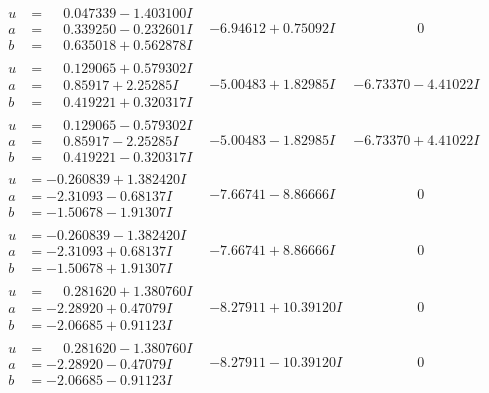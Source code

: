 \documentclass[1p]{elsarticle_modified}
\theoremstyle{definition}
\begin{document}
$$\begin{array}{c|c|c}
\begin{aligned}
u &= \phantom{-}0.047339 - 1.403100 I \\
a &= \phantom{-}0.339250 - 0.232601 I \\
b &= \phantom{-}0.635018 + 0.562878 I\end{aligned}
 & -6.94612 + 0.75092 I & \phantom{-0.000000 } 0 \\ \hline\begin{aligned}
u &= \phantom{-}0.129065 + 0.579302 I \\
a &= \phantom{-}0.85917 + 2.25285 I \\
b &= \phantom{-}0.419221 + 0.320317 I\end{aligned}
 & -5.00483 + 1.82985 I & -6.73370 - 4.41022 I \\ \hline\begin{aligned}
u &= \phantom{-}0.129065 - 0.579302 I \\
a &= \phantom{-}0.85917 - 2.25285 I \\
b &= \phantom{-}0.419221 - 0.320317 I\end{aligned}
 & -5.00483 - 1.82985 I & -6.73370 + 4.41022 I \\ \hline\begin{aligned}
u &= -0.260839 + 1.382420 I \\
a &= -2.31093 - 0.68137 I \\
b &= -1.50678 - 1.91307 I\end{aligned}
 & -7.66741 - 8.86666 I & \phantom{-0.000000 } 0 \\ \hline\begin{aligned}
u &= -0.260839 - 1.382420 I \\
a &= -2.31093 + 0.68137 I \\
b &= -1.50678 + 1.91307 I\end{aligned}
 & -7.66741 + 8.86666 I & \phantom{-0.000000 } 0 \\ \hline\begin{aligned}
u &= \phantom{-}0.281620 + 1.380760 I \\
a &= -2.28920 + 0.47079 I \\
b &= -2.06685 + 0.91123 I\end{aligned}
 & -8.27911 + 10.39120 I & \phantom{-0.000000 } 0 \\ \hline\begin{aligned}
u &= \phantom{-}0.281620 - 1.380760 I \\
a &= -2.28920 - 0.47079 I \\
b &= -2.06685 - 0.91123 I\end{aligned}
 & -8.27911 - 10.39120 I & \phantom{-0.000000 } 0 \\ \hline\begin{aligned}

\end{aligned}
\end{array}$$
\end{document}
